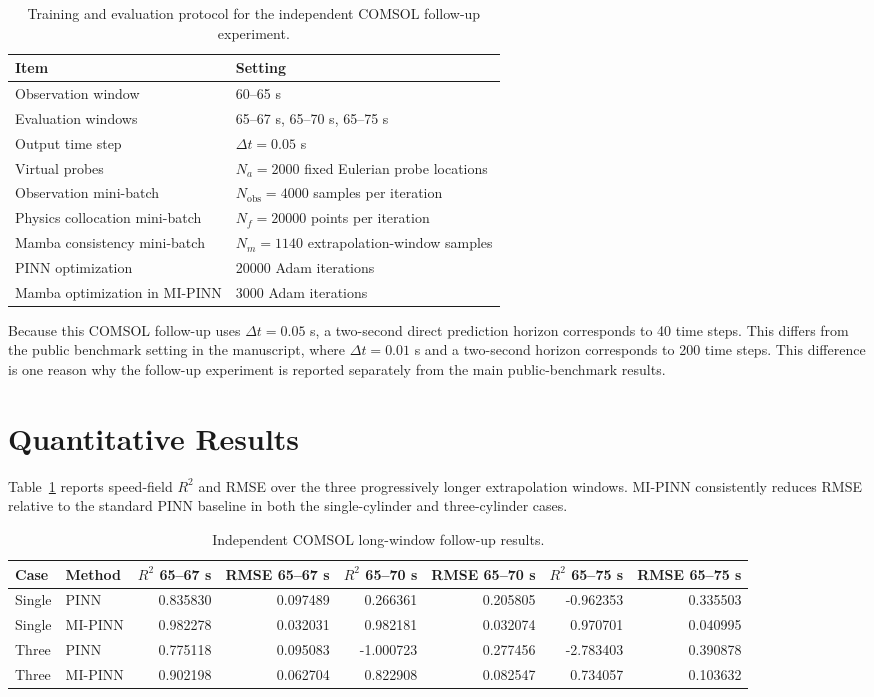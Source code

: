 \documentclass[11pt]{article}
\begin{document}
\begin{table}[htbp]
\centering
\caption{Training and evaluation protocol for the independent COMSOL follow-up experiment.}
\small
\begin{tabular}{ll}
\toprule
Item & Setting \\
\midrule
Observation window & 60--65 s \\
Evaluation windows & 65--67 s, 65--70 s, 65--75 s \\
Output time step & $\Delta t=0.05$ s \\
Virtual probes & $N_a=2000$ fixed Eulerian probe locations \\
Observation mini-batch & $N_{\mathrm{obs}}=4000$ samples per iteration \\
Physics collocation mini-batch & $N_f=20000$ points per iteration \\
Mamba consistency mini-batch & $N_m=1140$ extrapolation-window samples \\
PINN optimization & 20000 Adam iterations \\
Mamba optimization in MI-PINN & 3000 Adam iterations \\
\bottomrule
\end{tabular}
\end{table}

Because this COMSOL follow-up uses $\Delta t=0.05$ s, a two-second direct prediction horizon corresponds to 40 time steps. This differs from the public benchmark setting in the manuscript, where $\Delta t=0.01$ s and a two-second horizon corresponds to 200 time steps. This difference is one reason why the follow-up experiment is reported separately from the main public-benchmark results.

\section*{Quantitative Results}

Table~\ref{tab:formal_results} reports speed-field $R^2$ and RMSE over the three progressively longer extrapolation windows. MI-PINN consistently reduces RMSE relative to the standard PINN baseline in both the single-cylinder and three-cylinder cases.

\begin{table}[htbp]
\centering
\caption{Independent COMSOL long-window follow-up results.}
\label{tab:formal_results}
\scriptsize
\begin{tabular}{llrrrrrr}
\toprule
Case & Method & $R^2$ 65--67 s & RMSE 65--67 s & $R^2$ 65--70 s & RMSE 65--70 s & $R^2$ 65--75 s & RMSE 65--75 s \\
\midrule
Single & PINN & 0.835830 & 0.097489 & 0.266361 & 0.205805 & -0.962353 & 0.335503 \\
Single & MI-PINN & 0.982278 & 0.032031 & 0.982181 & 0.032074 & 0.970701 & 0.040995 \\
Three & PINN & 0.775118 & 0.095083 & -1.000723 & 0.277456 & -2.783403 & 0.390878 \\
Three & MI-PINN & 0.902198 & 0.062704 & 0.822908 & 0.082547 & 0.734057 & 0.103632 \\
\bottomrule
\end{tabular}
\end{table}
\end{document}
